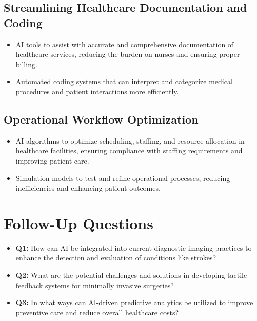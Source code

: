 \documentclass{article}
\begin{document}
\subsection*{Streamlining Healthcare Documentation and Coding}
\begin{itemize}
    \item AI tools to assist with accurate and comprehensive documentation of healthcare services, reducing the burden on nurses and ensuring proper billing.
    \item Automated coding systems that can interpret and categorize medical procedures and patient interactions more efficiently.
\end{itemize}

\subsection*{Operational Workflow Optimization}
\begin{itemize}
    \item AI algorithms to optimize scheduling, staffing, and resource allocation in healthcare facilities, ensuring compliance with staffing requirements and improving patient care.
    \item Simulation models to test and refine operational processes, reducing inefficiencies and enhancing patient outcomes.
\end{itemize}

\section*{Follow-Up Questions}

\begin{itemize}
    \item \textbf{Q1:} How can AI be integrated into current diagnostic imaging practices to enhance the detection and evaluation of conditions like strokes?
    \item \textbf{Q2:} What are the potential challenges and solutions in developing tactile feedback systems for minimally invasive surgeries?
    \item \textbf{Q3:} In what ways can AI-driven predictive analytics be utilized to improve preventive care and reduce overall healthcare costs?
\end{itemize}
\end{document}
